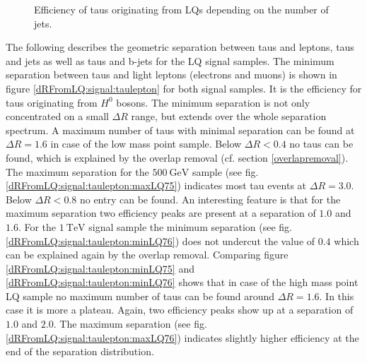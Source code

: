 \begin{figure}
\begin{subfigure}[t]{0.49\textwidth}
                \label{DividedFromLQ:signal:njetsLQ76}
                \end{subfigure}
\caption[Efficiency of taus originating from LQs depending on the number of jets.]{Efficiency of taus originating from LQs depending on the number of jets.}
\label{Divided:fromLQ:njets}
\end{figure}
%
The following describes the geometric separation between taus and leptons, taus and jets as well as taus and b-jets for the LQ signal samples.\newline
The minimum separation between taus and light leptons (electrons and muons) is shown in figure \ref{dRFromLQ:signal:taulepton} for both signal samples. It is the efficiency for taus originating from $H^0$ bosons. The minimum separation is not only concentrated on a small $\Delta R$ range, but extends over the whole separation spectrum. A maximum number of taus with minimal separation can be found at $\Delta R=1.6$ in case of the low mass point sample. Below $\Delta R<0.4$ no taus can be found, which is explained by the overlap removal (cf. section \ref{overlapremoval}). The maximum separation for the $\SI{500}{\giga\electronvolt}$ sample (see fig. \ref{dRFromLQ:signal:taulepton:maxLQ75}) indicates most tau events at $\Delta R=3.0$. Below $\Delta R<0.8$ no entry can be found. An interesting feature is that for the maximum separation two efficiency peaks are present at a separation of $1.0$ and $1.6$. For the $\SI{1}{\tera\electronvolt}$ signal sample the minimum separation (see fig. \ref{dRFromLQ:signal:taulepton:minLQ76}) does not undercut the value of $0.4$ which can be explained again by the overlap removal. Comparing figure \ref{dRFromLQ:signal:taulepton:minLQ75} and \ref{dRFromLQ:signal:taulepton:minLQ76} shows that in case of the high mass point LQ sample no maximum number of taus can be found around $\Delta R=1.6$. In this case it is more a plateau. Again, two efficiency peaks show up at a separation of $1.0$ and $2.0$. The maximum separation (see fig. \ref{dRFromLQ:signal:taulepton:maxLQ76}) indicates slightly higher efficiency at the end of the separation distribution.\newline     
%
%
%
